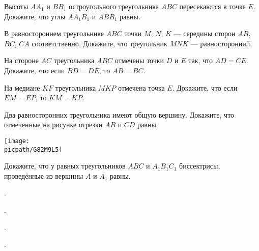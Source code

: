\begin{class}[number=5]
	\begin{listofex}
		\item Высоты \( AA_1 \) и \( BB_1 \) остроугольного треугольника \( ABC \) пересекаются в точке \( E \). Докажите, что	углы \( AA_1B_1 \) и \( ABB_1 \) равны.
		\item В равностороннем треугольнике \( ABC \) точки \( M \), \( N \), \( K \) --- середины сторон \( AB \), \( BC \), \( CA \) соответственно. Докажите, что треугольник \( MNK \) --- равносторонний.
		\item На стороне \( AC \) треугольника \( ABC \) отмечены точки \( D \) и \( E \) так, что \( AD=CE \). Докажите, что если \( BD=DE \), то \( AB=BC \).
		\item На медиане \( KF \) треугольника \( MKP \) отмечена точка \( E \). Докажите, что если \( EM=EP \), то \( KM=KP \).
		\item 
		\begin{minipage}[t]{\bodywidth}
			Два равносторонних треугольника имеют общую	вершину. Докажите, что отмеченные на рисунке отрезки \( AB \) и \( CD \) равны.
		\end{minipage}
		\gapwidth
		\begin{minipage}[t]{\picwidth}
			\texttt{[image: \\picpath/G82M9L5]}
		\end{minipage}
		\item Докажите, что у равных треугольников \( ABC \) и \( A_1B_1C_1 \) биссектрисы, проведённые из вершины \( A \) и \( A_1 \) равны.
	\end{listofex}
\end{class}

\begin{class}[number=6]
	\begin{listofex}
		\item .
	\end{listofex}
\end{class}

\begin{homework}[number=3]
	\begin{listofex}
		\item .
	\end{listofex}
\end{homework}

\begin{class}[number=7]
	\begin{listofex}
		\item.
	\end{listofex}
\end{class}

\begin{exam}
	\begin{listofex}
		\item .
	\end{listofex}
\end{exam}
